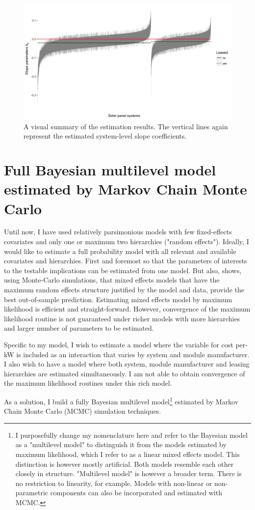 \documentclass[12pt]{article}
\begin{document}
\begin{figure}
  \centering
	\includegraphics[width=.8\textwidth]{figures/lease_sys_fig.png}
	\caption{A visual summary of the estimation results. The vertical lines again represent the estimated system-level slope coefficients.}
	\label{lease_sys_fig}
\end{figure}

\section{Full Bayesian multilevel model estimated by Markov Chain Monte Carlo}
Until now, I have used relatively parsimonious models with few fixed-effects covariates and only one or maximum two hierarchies ("random effects").  Ideally, I would like to estimate a full probability model with all relevant and available covariates and hierarchies. First and foremost so that the parameters of interests to the testable implications can be estimated from one model. But also, \citet{barr_random_2013} shows, using Monte-Carlo simulations, that mixed effects models that have the maximum random effects structure justified by the model and data, provide the best out-of-sample prediction. Estimating mixed effects model by maximum likelihood is efficient and straight-forward. However, convergence of the maximum likelihood routine is not guaranteed under richer models with more hierarchies and larger number of parameters to be estimated.

Specific to my model, I wish to estimate a model where the variable for cost per-kW is included as an interaction that varies by system and module manufacturer. I also wish to have a model where both system, module manufacturer and leasing hierarchies are estimated simultaneously. I am not able to obtain convergence of the maximum likelihood routines under this rich model.

As a solution, I build a fully Bayesian multilevel model\footnote{I purposefully change my nomenclature here and refer to the Bayesian model as a "multilevel model" to distinguish it from the models estimated by maximum likelihood, which I refer to as a linear mixed effects model. This distinction is however mostly artificial. Both models resemble each other closely in structure. "Multilevel model" is however a broader term. There is no restriction to linearity, for example. Models with non-linear or non-parametric components can also be incorporated and estimated with MCMC.} estimated by Markov Chain Monte Carlo (MCMC) simulation techniques.
\end{document}
